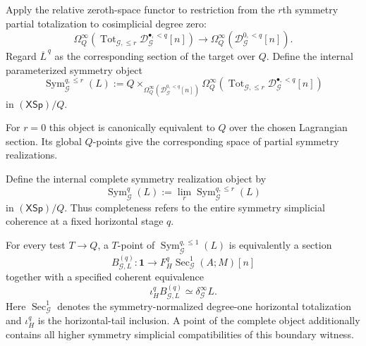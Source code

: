 \begin{definition}
\label{def:symmetry-noether-partial-symmetry-coherence-symmetry-object}
Apply the relative zeroth-space functor to restriction from the $r$th symmetry
partial totalization to cosimplicial degree zero:
\[
\Omega_Q^\infty
\left(
\operatorname{Tot}_{\mathcal G,\le r}
\mathcal D_{\mathcal G}^{\bullet,<q}[n]
\right)
\longrightarrow
\Omega_Q^\infty
\left(
\mathcal D_{\mathcal G}^{0,<q}[n]
\right).
\]
Regard $\overline L^{\,q}$ as the corresponding section of the target over $Q$.
Define the internal parameterized symmetry object
\[
\operatorname{Sym}_{\mathcal G}^{q,\le r}(L)
:=
Q
\times_{\Omega_Q^\infty(\mathcal D_{\mathcal G}^{0,<q}[n])}
\Omega_Q^\infty
\left(
\operatorname{Tot}_{\mathcal G,\le r}
\mathcal D_{\mathcal G}^{\bullet,<q}[n]
\right)
\]
in $(\mathsf{XSp})/Q$.
\end{definition}

For $r=0$ this object is canonically equivalent to $Q$ over the chosen
Lagrangian section.  Its global $Q$-points give the corresponding space of
partial symmetry realizations.

\begin{definition}
\label{def:symmetry-noether-complete-symmetry-realization}
Define the internal complete symmetry realization object by
\[
\operatorname{Sym}_{\mathcal G}^{q}(L)
:=
\lim_{r}
\operatorname{Sym}_{\mathcal G}^{q,\le r}(L)
\]
in $(\mathsf{XSp})/Q$.  Thus completeness refers to the entire symmetry simplicial
coherence at a fixed horizontal stage $q$.
\end{definition}

\begin{proposition}
\label{prop:symmetry-noether-degree-one-meaning}
For every test $T\to Q$, a $T$-point of
$\operatorname{Sym}_{\mathcal G}^{q,\le1}(L)$ is equivalently a section
\[
B_{\mathcal G,L}^{(q)}
:
\mathbf 1
\longrightarrow
F_H^q
\operatorname{Sec}_{\mathcal G}^1(A;M)[n]
\]
together with a specified coherent equivalence
\[
\iota_H^q B_{\mathcal G,L}^{(q)}
\simeq
\delta_{\mathcal G}^{\infty}L.
\]
Here
$\operatorname{Sec}_{\mathcal G}^1$ denotes the symmetry-normalized degree-one
horizontal totalization and $\iota_H^q$ is the horizontal-tail inclusion.
A point of the complete object additionally contains all higher symmetry simplicial
compatibilities of this boundary witness.
\end{proposition}

